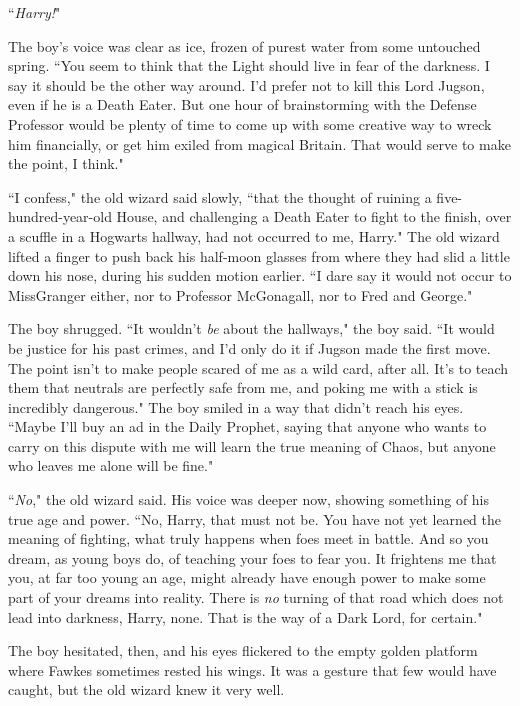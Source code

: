 ``\emph{Harry!}"

The boy's voice was clear as ice, frozen of purest water from some untouched spring. ``You seem to think that the Light should live in fear of the darkness. I say it should be the other way around. I'd prefer not to kill this Lord Jugson, even if he is a Death Eater. But one hour of brainstorming with the Defense Professor would be plenty of time to come up with some creative way to wreck him financially, or get him exiled from magical Britain. That would serve to make the point, I think."

``I confess," the old wizard said slowly, ``that the thought of ruining a five-hundred-year-old House, and challenging a Death Eater to fight to the finish, over a scuffle in a Hogwarts hallway, had not occurred to me, Harry." The old wizard lifted a finger to push back his half-moon glasses from where they had slid a little down his nose, during his sudden motion earlier. ``I dare say it would not occur to Miss\?Granger either, nor to Professor McGonagall, nor to Fred and George."

The boy shrugged. ``It wouldn't \emph{be} about the hallways," the boy said. ``It would be justice for his past crimes, and I'd only do it if Jugson made the first move. The point isn't to make people scared of me as a wild card, after all. It's to teach them that neutrals are perfectly safe from me, and poking me with a stick is incredibly dangerous." The boy smiled in a way that didn't reach his eyes. ``Maybe I'll buy an ad in the Daily Prophet, saying that anyone who wants to carry on this dispute with me will learn the true meaning of Chaos, but anyone who leaves me alone will be fine."

``\emph{No}," the old wizard said. His voice was deeper now, showing something of his true age and power. ``No, Harry, that must not be. You have not yet learned the meaning of fighting, what truly happens when foes meet in battle. And so you dream, as young boys do, of teaching your foes to fear you. It frightens me that you, at far too young an age, might already have enough power to make some part of your dreams into reality. There is \emph{no} turning of that road which does not lead into darkness, Harry, none. That is the way of a Dark Lord, for certain."

The boy hesitated, then, and his eyes flickered to the empty golden platform where Fawkes sometimes rested his wings. It was a gesture that few would have caught, but the old wizard knew it very well.

